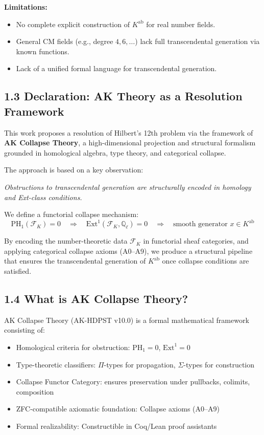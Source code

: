 \documentclass[11pt]{article}
\begin{document}
\textbf{Limitations:}
\begin{itemize}
    \item No complete explicit construction of \( K^{\mathrm{ab}} \) for real number fields.
    \item General CM fields (e.g., degree \( 4, 6, \ldots \)) lack full transcendental generation via known functions.
    \item Lack of a unified formal language for transcendental generation.
\end{itemize}

\subsection{1.3 Declaration: AK Theory as a Resolution Framework}

This work proposes a resolution of Hilbert's 12th problem via the framework of \textbf{AK Collapse Theory}, a high-dimensional projection and structural formalism grounded in homological algebra, type theory, and categorical collapse.

The approach is based on a key observation:

\begin{center}
\textit{Obstructions to transcendental generation are structurally encoded in homology and Ext-class conditions.}
\end{center}

We define a functorial collapse mechanism:
\[
\mathrm{PH}_1(\mathcal{F}_K) = 0 \quad \Rightarrow \quad \mathrm{Ext}^1(\mathcal{F}_K, \mathbb{Q}_\ell) = 0 \quad \Rightarrow \quad \text{smooth generator } x \in K^{\mathrm{ab}}
\]

By encoding the number-theoretic data \( \mathcal{F}_K \) in functorial sheaf categories, and applying categorical collapse axioms (A0–A9), we produce a structural pipeline that ensures the transcendental generation of \( K^{\mathrm{ab}} \) once collapse conditions are satisfied.

\subsection{1.4 What is AK Collapse Theory?}

AK Collapse Theory (AK-HDPST v10.0) is a formal mathematical framework consisting of:
\begin{itemize}
    \item Homological criteria for obstruction: \( \mathrm{PH}_1 = 0 \), \( \mathrm{Ext}^1 = 0 \)
    \item Type-theoretic classifiers: \( \Pi \)-types for propagation, \( \Sigma \)-types for construction
    \item Collapse Functor Category: ensures preservation under pullbacks, colimits, composition
    \item ZFC-compatible axiomatic foundation: Collapse axioms (A0–A9)
    \item Formal realizability: Constructible in Coq/Lean proof assistants
\end{itemize}
\end{document}
